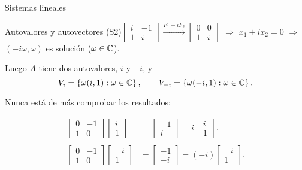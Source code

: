 \begin{chapter}{Sistemas lineales}
\begin{section}{Autovalores y autovectores}
        (S2)\quad  $\begin{bmatrix}	i&-1 \\ 1&i\end{bmatrix} \stackrel{F_1 -i F_2}{\longrightarrow} \begin{bmatrix}0&0 \\  1&i\end{bmatrix}$  $\Rightarrow$ $x_1+i x_2=0$ $\Rightarrow$ $(-i \omega,\omega)$ es solución ($\omega \in \mathbb C$).


        Luego $A$ tiene dos autovalores, $i$ y $-i$, y 
      \begin{equation*}
          V_i = \left\{ \omega(i,1): \omega\in \mathbb C \right\}, \qquad  V_{-i} = \left\{ \omega(-i,1): \omega\in \mathbb C \right\}.
      \end{equation*} 
        
         
     
        Nunca está de más comprobar los resultados:
    
        \begin{align*}
            \begin{bmatrix}0&-1\\1&0\end{bmatrix}\begin{bmatrix}i\\1\end{bmatrix} &= \begin{bmatrix}-1\\i\end{bmatrix} = i \begin{bmatrix}i\\1\end{bmatrix}.\\
            \\
            \begin{bmatrix}0&-1\\1&0\end{bmatrix}\begin{bmatrix}-i\\1\end{bmatrix} &= \begin{bmatrix}-1\\-i\end{bmatrix} = (-i) \begin{bmatrix}-i\\1\end{bmatrix}.
        \end{align*}
    
    
    
\end{section}	
    \end{chapter}

